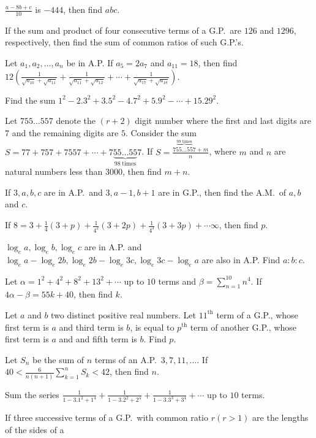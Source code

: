   $\frac{a - 8b + c}{10}$ is $-444$, then find $abc$.
\item If the sum and product of four consecutive terms of a G.P.\ are $126$ and $1296$, respectively, then
  find the sum of common ratios of such G.P.'s.
\item Let $a_1, a_2, \ldots, a_n$ be in A.P. If $a_5 = 2a_7$ and $a_{11} = 18$, then find
  $12\left(\frac{1}{\sqrt{a_{10}} + \sqrt{a_{11}}} + \frac{1}{\sqrt{a_{11}} + \sqrt{a_{12}}} + \cdots
  + \frac{1}{\sqrt{a_{17}} + \sqrt{a_{18}}}\right)$.
\item Find the sum $1^2 - 2.3^2 + 3.5^2 - 4.7^2 + 5.9^2 - \cdots + 15.29^2$.
\item Let $755\ldots 557$ denote the $(r + 2)$ digit number where the first and last digits are $7$ and the
  remaining digits are $5$. Consider the sum $S = 77 + 757 + 7557 + \cdots + 7\underbrace{55\ldots55}_{98
    \;\mathrm{times}}7$. If $S = \frac{7\overbrace{55\ldots55}^{99 \;\mathrm{times}}7 + m}{n}$, where $m$
  and $n$ are natural numbers less than $3000$, then find $m + n$.
\item If $3, a, b, c$ are in A.P.\ and $3, a - 1, b + 1$ are in G.P., then find the A.M.\ of $a, b$ and $c$.
\item If $8 = 3 + \frac{1}{4}(3 + p) + \frac{1}{4^2}(3 + 2p) + \frac{1}{4^3}(3 + 3p) + \cdots \infty$, then
  find $p$.
\item $\log_ea, \log_eb, \log_ec$ are in A.P. and $\log_ea - \log_e2b, \log_e2b - \log_e3c, \log_e3c -
  \log_ea$ are also in A.P. Find $a:b:c$.
\item Let $\alpha = 1^2 + 4^2 + 8^2 + 13^2 + \cdots$ up to $10$ terms and $\beta = \displaystyle\sum_{n =
  1}^{10}n^4$. If $4\alpha - \beta = 55k + 40$, then find $k$.
\item Let $a$ and $b$ two distinct positive real numbers. Let $11^{\mathrm{th}}$ term of a G.P., whose first
  term is $a$ and third term is $b$, is equal to $p^{\mathrm{th}}$ term of another G.P., whose first term is
  $a$ and and fifth term is $b$. Find $p$.
\item Let $S_n$ be the sum of $n$ terms of an A.P.\ $3, 7, 11, \ldots$. If $40 < \frac{6}{n(n +
  1)}\displaystyle\sum_{k = 1}^nS_k < 42$, then find $n$.
\item Sum the series $\frac{1}{1 - 3.1^2 + 1^4} + \frac{1}{1 - 3.2^2 + 2^4} + \frac{1}{1 - 3.3^3 + 3^4} +
  \cdots$ up to $10$ terms.
\item If three successive terms of a G.P.\ with common ratio $r(r > 1)$ are the lengths of the sides of a
